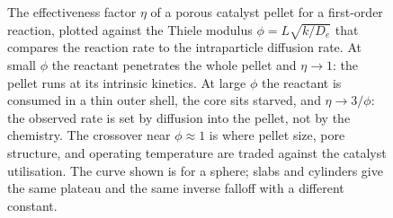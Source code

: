\begin{figure}[htbp]
\centering
{}
\caption[Catalyst-pellet effectiveness factor versus Thiele
modulus]{The effectiveness factor $\eta$ of a porous catalyst pellet for
a first-order reaction, plotted against the Thiele modulus
$\phi=L\sqrt{k/D_e}$ that compares the reaction rate to the
intraparticle diffusion rate. At small $\phi$ the reactant penetrates the
whole pellet and $\eta\to 1$: the pellet runs at its intrinsic kinetics.
At large $\phi$ the reactant is consumed in a thin outer shell, the core
sits starved, and $\eta\to 3/\phi$: the observed rate is set by diffusion
into the pellet, not by the chemistry. The crossover near $\phi\approx 1$
is where pellet size, pore structure, and operating temperature are
traded against the catalyst utilisation. The curve shown is for a sphere;
slabs and cylinders give the same plateau and the same inverse falloff
with a different constant.}
\label{fig:vol04ch07:effectiveness}
\end{figure}
